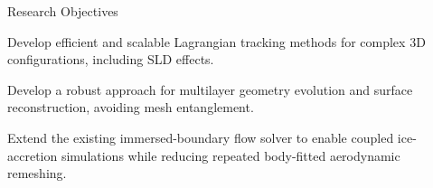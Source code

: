 \begin{frame}{Research Objectives}

\vspace{0.12cm}

\begin{center}
\end{center}

\vspace{0.30cm}

{Develop efficient and scalable Lagrangian tracking
methods for complex 3D configurations,
including SLD effects.}

\par\vspace{0.28cm}

{Develop a robust approach for multilayer
geometry evolution and surface reconstruction,
avoiding mesh entanglement.}

\par\vspace{0.28cm}

{Extend the existing immersed-boundary flow solver
to enable coupled ice-accretion simulations while
reducing repeated body-fitted aerodynamic remeshing.}

\end{frame}

